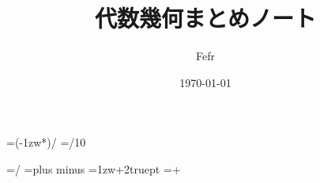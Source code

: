 \documentclass[dvipdfmx,a4paper,11pt]{jsbook}
\begin{document}
\setlength{\footskip}{20truemm}




\makeatletter
\newcount\@chars\newcount\@lines
{}                      %

\newdimen\@kanjiskip
\@kanjiskip=\dimexpr(\textwidth-1zw*\@chars)/\numexpr{}
\newdimen\@@kanjiskip
\@@kanjiskip=\dimexpr\@kanjiskip/10

\baselineskip=\dimexpr\textheight/\@lines
\kanjiskip=\@kanjiskip plus \@@kanjiskip minus \@@kanjiskip
\parindent=\dimexpr 1zw+2truept
\parindent=\dimexpr\parindent+\@kanjiskip
\makeatother




\title{代数幾何まとめノート}
\date{\today}
\author{Fefr}
\maketitle




\tableofcontents
\clearpage
\end{document}
